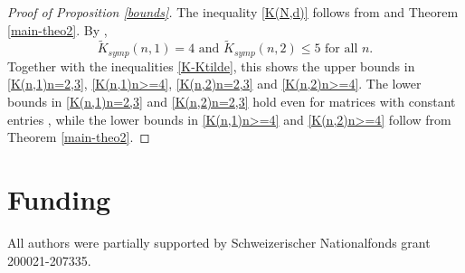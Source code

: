 \documentclass[10pt]{amsart}
\theoremstyle{remark}
\begin{document}
\begin{proof}[Proof of Proposition \ref{bounds}]
    The inequality \eqref{K(N,d)} follows from \cite[Theorem 2.4]{HKS} and Theorem \ref{main-theo2}.
    By \cite[Theorem 1]{HKS}, 
    \[
        \tilde{K}_{symp}(n,1) = 4 \text{ and }\tilde{K}_{symp}(n,2) \le 5 \text{ for all } n.
    \]
    Together with the inequalities \eqref{K-Ktilde}, this shows the upper bounds in \eqref{K(n,1)n=2,3}, \eqref{K(n,1)n>=4}, \eqref{K(n,2)n=2,3} and \eqref{K(n,2)n>=4}. 
     The lower bounds in \eqref{K(n,1)n=2,3} and \eqref{K(n,2)n=2,3} hold even for matrices with constant entries \cite{JTZ}, while the lower bounds in \eqref{K(n,1)n>=4} and \eqref{K(n,2)n>=4} follow from Theorem \ref{main-theo2}. 
\end{proof}

\section*{Funding}

All authors were partially supported by Schweizerischer Nationalfonds grant 200021-207335.

\end{document}
